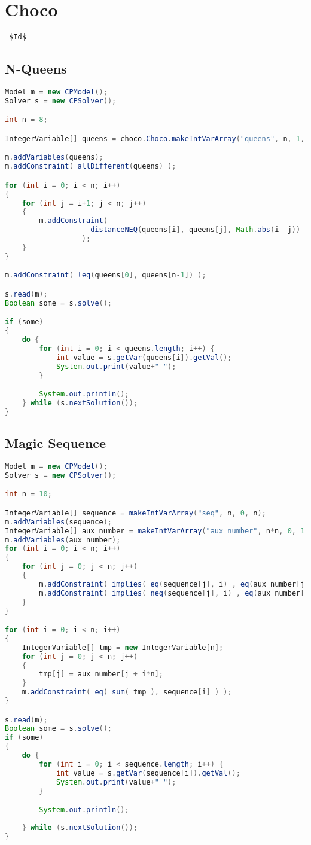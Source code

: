 \section{Choco}
\label{implementation:choco}
\verb= $Id$ =

\subsection{N-Queens}
\begin{lstlisting}[language=Java]
Model m = new CPModel();
Solver s = new CPSolver();

int n = 8;

IntegerVariable[] queens = choco.Choco.makeIntVarArray("queens", n, 1, n);

m.addVariables(queens);
m.addConstraint( allDifferent(queens) );

for (int i = 0; i < n; i++)
{
    for (int j = i+1; j < n; j++)
    {
        m.addConstraint(
                    distanceNEQ(queens[i], queens[j], Math.abs(i- j))
                  );
    }
}

m.addConstraint( leq(queens[0], queens[n-1]) );

s.read(m);
Boolean some = s.solve();

if (some)
{
    do {
        for (int i = 0; i < queens.length; i++) {
            int value = s.getVar(queens[i]).getVal();
            System.out.print(value+" ");
        }

        System.out.println();
    } while (s.nextSolution());
}
\end{lstlisting}

\subsection{Magic Sequence}
\begin{lstlisting}[language=Java]
Model m = new CPModel();
Solver s = new CPSolver();

int n = 10;

IntegerVariable[] sequence = makeIntVarArray("seq", n, 0, n);
m.addVariables(sequence);
IntegerVariable[] aux_number = makeIntVarArray("aux_number", n*n, 0, 1);
m.addVariables(aux_number);
for (int i = 0; i < n; i++)
{
    for (int j = 0; j < n; j++)
    {
        m.addConstraint( implies( eq(sequence[j], i) , eq(aux_number[j + i*n], 1) ) );
        m.addConstraint( implies( neq(sequence[j], i) , eq(aux_number[j + i*n], 0) ) );
    }
}

for (int i = 0; i < n; i++)
{
    IntegerVariable[] tmp = new IntegerVariable[n];
    for (int j = 0; j < n; j++)
    {
        tmp[j] = aux_number[j + i*n];
    }
    m.addConstraint( eq( sum( tmp ), sequence[i] ) );
}

s.read(m);
Boolean some = s.solve();
if (some)
{
    do {
        for (int i = 0; i < sequence.length; i++) {
            int value = s.getVar(sequence[i]).getVal();
            System.out.print(value+" ");
        }

        System.out.println();
        
    } while (s.nextSolution());
}
\end{lstlisting}

